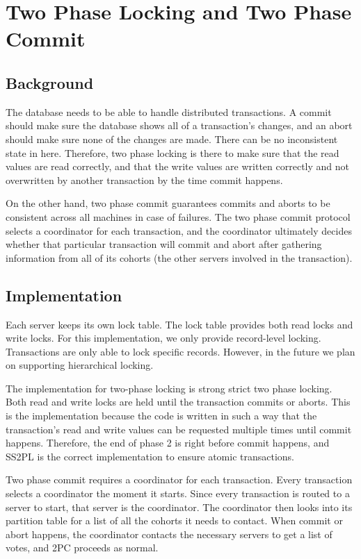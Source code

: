 \documentclass[a4paper, 10pt, notitlepage]{article}
\begin{document}
\section{Two Phase Locking and Two Phase Commit}

\subsection{Background}
The database needs to be able to handle distributed transactions. A commit should make sure the database shows all of a transaction's
changes, and an abort should make sure none of the changes are made. There can be no inconsistent state in here. Therefore, two phase
locking is there to make sure that the read values are read correctly, and that the write values are written correctly and not
overwritten by another transaction by the time commit happens.

On the other hand, two phase commit guarantees commits and aborts to be consistent across all machines in case of failures. The 
two phase commit protocol selects a coordinator for each transaction, and the coordinator ultimately decides whether that particular
transaction will commit and abort after gathering information from all of its cohorts (the other servers involved in the transaction).

\subsection{Implementation}

Each server keeps its own lock table. The lock table provides both read locks and write locks. For this implementation, we only provide
record-level locking. Transactions are only able to lock specific records. However, in the future we plan on supporting hierarchical
locking. 

The implementation for two-phase locking is strong strict two phase locking. Both read and write locks are held until the transaction
commits or aborts. This is the implementation because the code is written in such a way that the transaction's read and write values
can be requested multiple times until commit happens. Therefore, the end of phase 2 is right before commit happens, and SS2PL is the
correct implementation to ensure atomic transactions.

Two phase commit requires a coordinator for each transaction. Every transaction selects a coordinator the moment
it starts. Since every transaction is routed to a server to start, that server is the coordinator. The coordinator then looks
into its partition table for a list of all the cohorts it needs to contact. When commit or abort happens, the coordinator
contacts the necessary servers to get a list of votes, and 2PC proceeds as normal.
\end{document}
